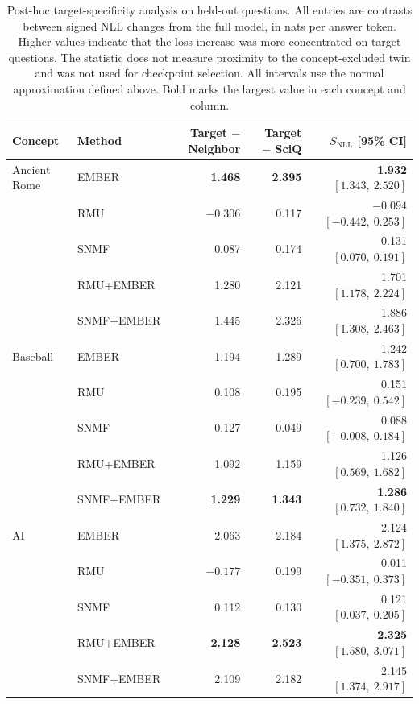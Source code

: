 \begin{table}[t]
  \centering
  \footnotesize
  \renewcommand{\arraystretch}{1.05}
  \begin{tabular}{llrrr}
    \toprule
    Concept & Method & Target $-$ Neighbor & Target $-$ SciQ
      & $S_{\mathrm{NLL}}$ [95\% CI] \\
    \midrule
    Ancient Rome & EMBER & \textbf{1.468} & \textbf{2.395} & \textbf{1.932 $[1.343,\ 2.520]$} \\
                 & RMU   & $-0.306$ & 0.117 & $-0.094$ $[-0.442,\ 0.253]$ \\
                 & SNMF  & 0.087 & 0.174 & 0.131 $[0.070,\ 0.191]$ \\
                 & RMU+EMBER & 1.280 & 2.121 & 1.701 $[1.178,\ 2.224]$ \\
                 & SNMF+EMBER & 1.445 & 2.326 & 1.886 $[1.308,\ 2.463]$ \\
    \midrule
    Baseball     & EMBER & 1.194 & 1.289 & 1.242 $[0.700,\ 1.783]$ \\
                 & RMU   & 0.108 & 0.195 & 0.151 $[-0.239,\ 0.542]$ \\
                 & SNMF  & 0.127 & 0.049 & 0.088 $[-0.008,\ 0.184]$ \\
                 & RMU+EMBER & 1.092 & 1.159 & 1.126 $[0.569,\ 1.682]$ \\
                 & SNMF+EMBER & \textbf{1.229} & \textbf{1.343} & \textbf{1.286 $[0.732,\ 1.840]$} \\
    \midrule
    AI           & EMBER & 2.063 & 2.184 & 2.124 $[1.375,\ 2.872]$ \\
                 & RMU   & $-0.177$ & 0.199 & 0.011 $[-0.351,\ 0.373]$ \\
                 & SNMF  & 0.112 & 0.130 & 0.121 $[0.037,\ 0.205]$ \\
                 & RMU+EMBER & \textbf{2.128} & \textbf{2.523} & \textbf{2.325 $[1.580,\ 3.071]$} \\
                 & SNMF+EMBER & 2.109 & 2.182 & 2.145 $[1.374,\ 2.917]$ \\
    \bottomrule
  \end{tabular}
  \caption{Post-hoc target-specificity analysis on held-out questions. All
  entries are contrasts between signed NLL changes from the full model, in
  nats per answer token. Higher values indicate that the loss increase was
  more concentrated on target questions. The statistic does not measure
  proximity to the concept-excluded twin and was not used for checkpoint
  selection. All intervals use the normal approximation defined above.
  Bold marks the largest value in each concept and column.}
  \label{tab:nll-selectivity}
\end{table}
